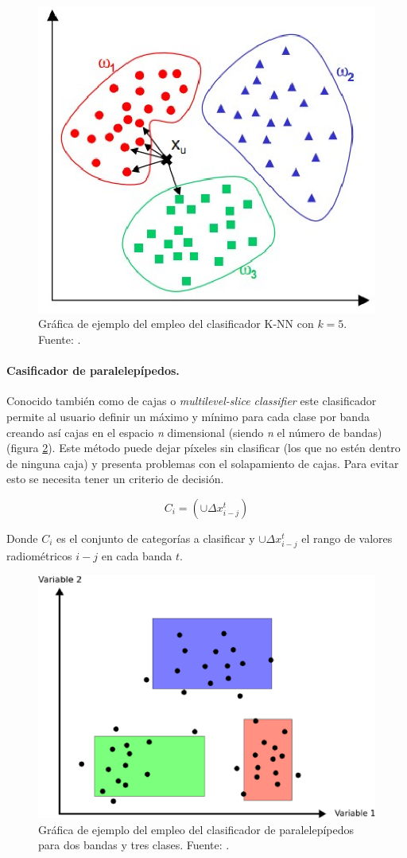 \begin{figure}
	\centering
	\includegraphics[width=0.6\linewidth]{./Imagenes/KNN.eps}
	\caption[Clasificador \textit{K-Nearest Neighbor}]{Gráfica de ejemplo del empleo del clasificador K-NN con $k=5$. Fuente: \cite{JARS1999}.}
	\label{fig:KNN}
\end{figure}

\paragraph{Casificador de paralelepípedos.}
Conocido también como de cajas o \textit{multilevel-slice classifier} este clasificador permite al usuario definir un máximo y mínimo para cada clase por banda creando así cajas en el espacio \textit{n} dimensional (siendo \textit{n} el número de bandas) (figura \ref{fig:paralele}). Este método puede dejar píxeles sin clasificar (los que no estén dentro de ninguna caja) y presenta problemas con el solapamiento de cajas. Para evitar esto se necesita tener un criterio de decisión.

\begin{equation}
C_{i}=(\cup\Delta x^{t}_{i-j})
\end{equation}

Donde $C_{i}$ es el conjunto de categorías a clasificar y $\cup\Delta x^{t}_{i-j}$ el rango de valores radiométricos $i-j$ en cada banda $t$.

\begin{figure}
	\centering
	\includegraphics[width=0.6\linewidth]{./Imagenes/Paralelepipedos.eps}
	\caption[Clasificador de paralelepípedos]{Gráfica de ejemplo del empleo del clasificador de paralelepípedos para dos bandas y tres clases. Fuente: \cite{Olaya2010}.}
	\label{fig:paralele}	
\end{figure}

